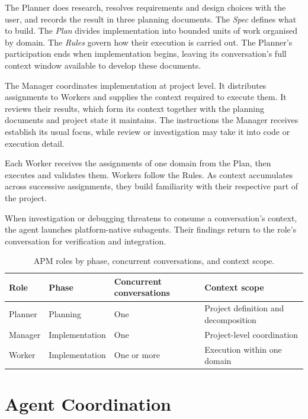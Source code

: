 The Planner does research, resolves requirements and design choices with the user, and records the result in three planning documents. The \emph{Spec} defines what to build. The \emph{Plan} divides implementation into bounded units of work organised by domain. The \emph{Rules} govern how their execution is carried out. The Planner's participation ends when implementation begins, leaving its conversation's full context window available to develop these documents.

The Manager coordinates implementation at project level. It distributes assignments to Workers and supplies the context required to execute them. It reviews their results, which form its context together with the planning documents and project state it maintains. The instructions the Manager receives establish its usual focus, while review or investigation may take it into code or execution detail.

Each Worker receives the assignments of one domain from the Plan, then executes and validates them. Workers follow the Rules. As context accumulates across successive assignments, they build familiarity with their respective part of the project.

When investigation or debugging threatens to consume a conversation's context, the agent launches platform-native subagents. Their findings return to the role's conversation for verification and integration.

\begin{table}[H]
  \centering
  \caption{APM roles by phase, concurrent conversations, and context scope.}
  \label{tab:framework-design-agent-roles}
  \begin{tabular*}{\textwidth}{@{\extracolsep{\fill}}llll}
    \toprule
    Role & Phase & Concurrent conversations & Context scope \\
    \midrule
    Planner & Planning & One & Project definition and decomposition \\
    Manager & Implementation & One & Project-level coordination \\
    Worker & Implementation & One or more & Execution within one domain \\
    \bottomrule
  \end{tabular*}
\end{table}

\section{Agent Coordination}
\label{sec:framework-design-agent-coordination}

